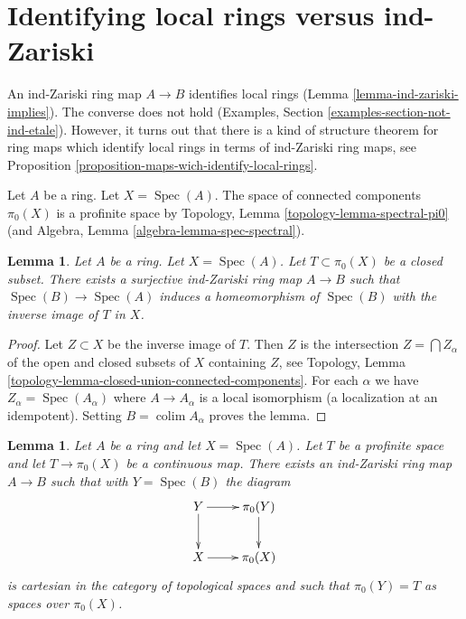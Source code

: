 \documentclass{stacks-project}
\theoremstyle{plain}
\newtheorem{lemma}[subsection]{Lemma}
\theoremstyle{definition}
\theoremstyle{remark}
\numberwithin{equation}{subsection}
\def\colim{\mathop{\mathrm{colim}}\nolimits}
\def\Spec{\mathop{\mathrm{Spec}}}
\begin{document}
\section{Identifying local rings versus ind-Zariski}
\label{section-connected-components}

\noindent
An ind-Zariski ring map $A \to B$ identifies local rings
(Lemma \ref{lemma-ind-zariski-implies}). The converse does not hold
(Examples, Section \ref{examples-section-not-ind-etale}).
However, it turns out that there is a kind of structure theorem for
ring maps which identify local rings in terms of ind-Zariski
ring maps, see Proposition \ref{proposition-maps-wich-identify-local-rings}.

\medskip\noindent
Let $A$ be a ring. Let $X = \Spec(A)$. The space of connected
components $\pi_0(X)$ is a profinite space by
Topology, Lemma \ref{topology-lemma-spectral-pi0}
(and Algebra, Lemma \ref{algebra-lemma-spec-spectral}).

\begin{lemma}
\label{lemma-construct}
Let $A$ be a ring. Let $X = \Spec(A)$. Let $T \subset \pi_0(X)$ be a
closed subset. There exists a surjective ind-Zariski ring map $A \to B$
such that $\Spec(B) \to \Spec(A)$ induces a homeomorphism of $\Spec(B)$
with the inverse image of $T$ in $X$.
\end{lemma}

\begin{proof}
Let $Z \subset X$ be the inverse image of $T$. Then $Z$ is the intersection
$Z = \bigcap Z_\alpha$ of the open and closed subsets of $X$ containing $Z$,
see Topology, Lemma \ref{topology-lemma-closed-union-connected-components}.
For each $\alpha$ we have $Z_\alpha = \Spec(A_\alpha)$ where
$A \to A_\alpha$ is a local isomorphism (a localization at an idempotent).
Setting $B = \colim A_\alpha$ proves the lemma.
\end{proof}

\begin{lemma}
\label{lemma-construct-profinite}
Let $A$ be a ring and let $X = \Spec(A)$. Let $T$ be a profinite space and
let $T \to \pi_0(X)$ be a continuous map. There exists an
ind-Zariski ring map $A \to B$ such that with $Y = \Spec(B)$ the diagram
$$
\xymatrix{
Y \ar[r] \ar[d] & \pi_0(Y) \ar[d] \\
X \ar[r] & \pi_0(X)
}
$$
is cartesian in the category of topological spaces and such that
$\pi_0(Y) = T$ as spaces over $\pi_0(X)$.
\end{lemma}
\end{document}
